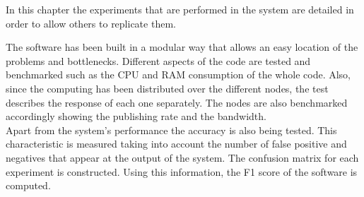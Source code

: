 
In this chapter the experiments that are performed in the system are detailed in order to allow others to replicate them. 

The software has been built in a modular way that allows an easy location of the problems and bottlenecks.
Different aspects of the code are tested and benchmarked such as the CPU and RAM consumption of the whole code. 
Also, since the computing has been distributed over the different nodes, the test describes the response of each one separately. 
The nodes are also benchmarked accordingly showing the publishing rate and the bandwidth. 
\\%

Apart from the system's performance the accuracy is also being tested. 
This characteristic is measured taking into account the number of false positive and negatives that appear at the output of the system. 
The confusion matrix for each experiment is constructed. 
Using this information, the F1 score of the software is computed. 
\\%



